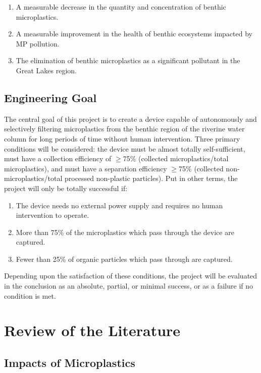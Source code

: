 \documentclass[fleqn,10pt]{SelfArx} %
\begin{document}
	\begin{enumerate}
		\item A measurable decrease in the quantity and concentration of \gls{benthic} microplastics.
		\item A measurable improvement in the health of \gls{benthic} ecosystems impacted by MP pollution. 
		\item The elimination of \gls{benthic} microplastics as a significant pollutant in the Great Lakes region.
		
	\end{enumerate}
	

	\printglossaries

	
	
	
	\subsection{Engineering Goal}
	\label{sec:goals}
	The central goal of this project is to create a device capable of autonomously and selectively filtering microplastics from the \gls{benthic} region of the riverine water column for long periods of time without human intervention. Three primary conditions will be considered: the device must be almost totally self-sufficient, must have a collection efficiency of $\geq$75\% (collected microplastics/total microplastics), and must have a separation efficiency $\geq$75\% (collected non-microplastics/total processed non-plastic particles). Put in other terms, the project will only be totally successful if:
	\begin{enumerate}
		\item The device needs no external power supply and requires no human intervention to operate.
		\item More than 75\% of the microplastics which pass through the device are captured.
		\item Fewer than 25\% of organic particles which pass through are captured.	
	\end{enumerate}
	Depending upon the satisfaction of these conditions, the project will be evaluated in the conclusion as an absolute, partial, or minimal success, or as a failure if no condition is met.
	\section{Review of the Literature}
	\subsection{Impacts of Microplastics}
\end{document}
